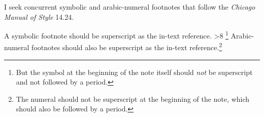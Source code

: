 \documentclass{article}
\newcounter{savefootnote}
\newcounter{symfootnote}
\newcommand{\symfootnote}[1]{%
   \setcounter{savefootnote}{\value{footnote}}%
   \setcounter{footnote}{\value{symfootnote}}%
   \ifnum\value{footnote}>8\setcounter{footnote}{0}\fi%
   \let\oldthefootnote=\thefootnote%
   \renewcommand{\thefootnote}{\fnsymbol{footnote}}%
   \footnote{#1}%
   \let\thefootnote=\oldthefootnote%
   \setcounter{symfootnote}{\value{footnote}}%
   \setcounter{footnote}{\value{savefootnote}}%
}
\begin{document}
I seek concurrent symbolic and arabic-numeral footnotes that follow the \emph{Chicago Manual of Style} 14.24.

A symbolic footnote should be superscript as the in-text reference.\symfootnote{But the symbol at the beginning of the note itself should \emph{not} be superscript and not followed by a period.} Arabic-numeral footnotes should also be superscript as the in-text reference.\footnote{The numeral should not be superscript at the beginning of the note, which should also be followed by a period.}
\end{document}
